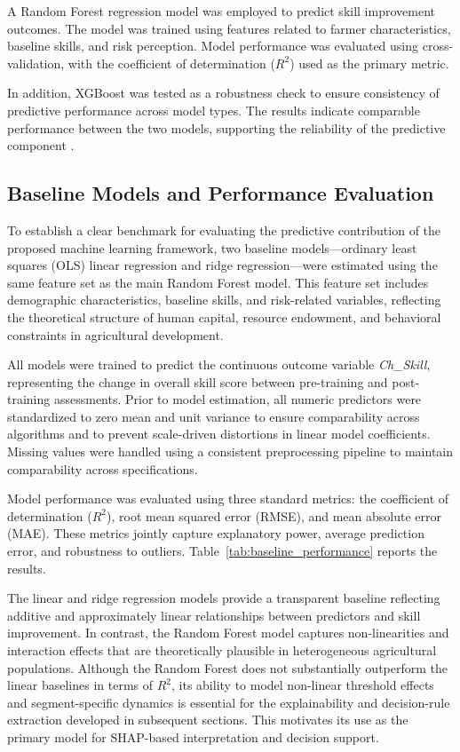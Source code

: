 A Random Forest regression model was employed to predict skill improvement outcomes\cite{breiman2001}. The model was trained using features related to farmer characteristics, baseline skills, and risk perception. Model performance was evaluated using cross-validation, with the coefficient of determination ($R^2$) used as the primary metric.

In addition, XGBoost was tested as a robustness check to ensure consistency of predictive performance across model types. The results indicate comparable performance between the two models, supporting the reliability of the predictive component \cite{chen2016}.

\subsection{Baseline Models and Performance Evaluation}

To establish a clear benchmark for evaluating the predictive contribution of the proposed machine learning framework, two baseline models—ordinary least squares (OLS) linear regression and ridge regression—were estimated using the same feature set as the main Random Forest model. This feature set includes demographic characteristics, baseline skills, and risk-related variables, reflecting the theoretical structure of human capital, resource endowment, and behavioral constraints in agricultural development.

All models were trained to predict the continuous outcome variable \textit{Ch\_Skill}, representing the change in overall skill score between pre-training and post-training assessments. Prior to model estimation, all numeric predictors were standardized to zero mean and unit variance to ensure comparability across algorithms and to prevent scale-driven distortions in linear model coefficients. Missing values were handled using a consistent preprocessing pipeline to maintain comparability across specifications.

Model performance was evaluated using three standard metrics: the coefficient of determination ($R^{2}$), root mean squared error (RMSE), and mean absolute error (MAE). These metrics jointly capture explanatory power, average prediction error, and robustness to outliers. Table~\ref{tab:baseline_performance} reports the results.

The linear and ridge regression models provide a transparent baseline reflecting additive and approximately linear relationships between predictors and skill improvement. In contrast, the Random Forest model captures non-linearities and interaction effects that are theoretically plausible in heterogeneous agricultural populations. Although the Random Forest does not substantially outperform the linear baselines in terms of $R^{2}$, its ability to model non-linear threshold effects and segment-specific dynamics is essential for the explainability and decision-rule extraction developed in subsequent sections. This motivates its use as the primary model for SHAP-based interpretation and decision support.

